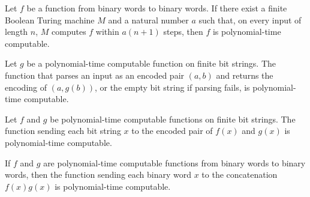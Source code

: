 \begin{lemma}
\label{Complexity.clNative_linear}
\leanok
{}
Let $f$ be a function from binary words to binary words. If there exist a finite Boolean
Turing machine $M$ and a natural number $a$ such that, on every input of length $n$, $M$
computes $f$ within $a(n+1)$ steps, then $f$ is polynomial-time computable.
\end{lemma}

\begin{lemma}
\label{Complexity.clNative_map}
\leanok
{}
Let $g$ be a polynomial-time computable function on finite bit strings. The function
that parses an input as an encoded pair $(a,b)$ and returns the encoding of $(a,g(b))$,
or the empty bit string if parsing fails, is polynomial-time computable.
\end{lemma}

\begin{lemma}
\label{Complexity.clNative_pair}
\leanok
{}
Let $f$ and $g$ be polynomial-time computable functions on finite bit strings. The
function sending each bit string $x$ to the encoded pair of $f(x)$ and $g(x)$ is
polynomial-time computable.
\end{lemma}

\begin{lemma}
\label{Complexity.clNative_append}
\leanok
{}
If $f$ and $g$ are polynomial-time computable functions from binary words to binary
words, then the function sending each binary word $x$ to the concatenation $f(x)g(x)$ is
polynomial-time computable.
\end{lemma}


